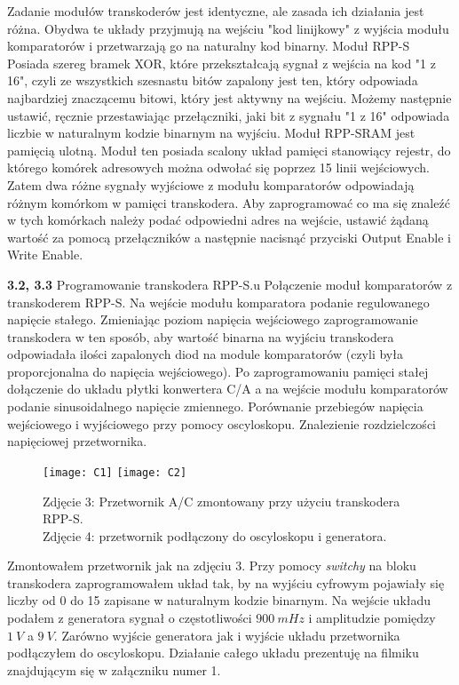 \documentclass[14pt, table]{extarticle}
\begin{document}
Zadanie modułów transkoderów jest identyczne, ale zasada ich działania jest różna. Obydwa te układy przyjmują na wejściu "kod linijkowy" z wyjścia modułu komparatorów i przetwarzają go na naturalny kod binarny. Moduł RPP-S Posiada szereg bramek XOR, które przekształcają sygnał z wejścia na kod "1 z 16", czyli ze wszystkich szesnastu bitów zapalony jest ten, który odpowiada najbardziej znaczącemu bitowi, który jest aktywny na wejściu. Możemy następnie ustawić, ręcznie przestawiając przełączniki, jaki bit z sygnału "1 z 16" odpowiada liczbie w naturalnym kodzie binarnym na wyjściu. Moduł RPP-SRAM jest pamięcią ulotną. Moduł ten posiada scalony układ pamięci stanowiący rejestr, do którego komórek adresowych można odwołać się poprzez 15 linii wejściowych. Zatem dwa różne sygnały wyjściowe z modułu komparatorów odpowiadają różnym komórkom w pamięci transkodera. Aby zaprogramować co ma się znaleźć w tych komórkach należy podać odpowiedni adres na wejście, ustawić żądaną wartość za pomocą przełączników a następnie nacisnąć przyciski Output Enable i Write Enable.

\newpage
\textbf{3.2, 3.3} Programowanie transkodera RPP-S.u Połączenie moduł komparatorów z transkoderem RPP-S. Na wejście modułu komparatora podanie regulowanego napięcie stałego. Zmieniając poziom napięcia wejściowego zaprogramowanie transkodera w ten sposób, aby wartość binarna na wyjściu transkodera odpowiadała ilości zapalonych diod na module komparatorów (czyli była proporcjonalna do napięcia wejściowego). Po zaprogramowaniu pamięci stałej dołączenie do układu płytki konwertera C/A a na wejście modułu komparatorów podanie sinusoidalnego napięcie zmiennego. Porównanie przebiegów napięcia wejściowego i wyjściowego przy pomocy oscyloskopu. Znalezienie rozdzielczości napięciowej przetwornika.

\begin{figure}[H]
\texttt{[image: C1]}
\texttt{[image: C2]}
\centering
\captionsetup{labelformat=empty}
\caption{Zdjęcie 3: Przetwornik A/C zmontowany przy użyciu transkodera RPP-S. \\ Zdjęcie 4: przetwornik podłączony do oscyloskopu i generatora.}
\end{figure}

Zmontowałem przetwornik jak na zdjęciu 3. Przy pomocy \textit{switchy} na bloku transkodera zaprogramowałem układ tak, by na wyjściu cyfrowym pojawiały się liczby od 0 do 15 zapisane w naturalnym kodzie binarnym. Na wejście układu podałem z generatora sygnał o częstotliwości $900 \ mHz$ i amplitudzie pomiędzy $1 \ V$ a $9 \ V$. Zarówno wyjście generatora jak i wyjście układu przetwornika podłączyłem do oscyloskopu. Działanie całego układu prezentuję na filmiku znajdującym się w załączniku numer 1.
\end{document}
